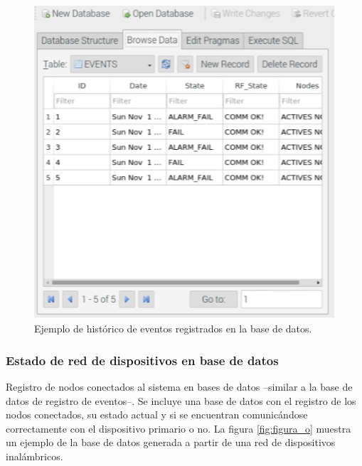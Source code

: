 \begin{figure}[ht]

	\centering
	\includegraphics[scale=.45]{./Figures/Capitulo4/Figura_P.png}
	\caption{Ejemplo de histórico de eventos registrados en la base de datos.}
	\label{fig:figura_p}
\end{figure}

\subsubsection{Estado de red de dispositivos en base de datos}
Registro de nodos conectados al sistema en bases de datos --similar a la base de datos de registro de eventos--. Se incluye una base de datos con el registro de los nodos conectados, su estado actual y si se encuentran comunicándose correctamente con el dispositivo primario o no. La figura \ref{fig:figura_o}  muestra un ejemplo de la base de datos generada a partir de una red de dispositivos inalámbricos.


